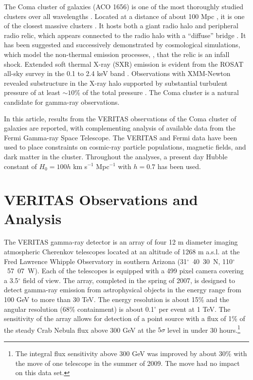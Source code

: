 \documentclass[12pt,manuscript]{aastex}
\begin{document}
The Coma cluster of galaxies (ACO 1656) is one of the most thoroughly studied clusters over all
wavelengths \citep{article:Voges_etal:1999}. Located at a distance of about 100 Mpc
\citep[$z=0.023$;][]{article:StrubleRood:1999}, it is one of the closest massive clusters
\citep[$M \sim10^{15}M_{\odot}$;][]{article:Smith:1983, article:Kubo_etal:2008}. It hosts both a
giant radio halo \citep{article:Giovannini_etal:1993,article:Thierbach_etal:2003} and peripheral
radio relic, which appears connected to the radio halo with a ``diffuse'' bridge 
\citep[see discussion in][]{article:BrownRudnick:2010}. It has been suggested
\citep{article:Ensslin_etal:1998} and successively demonstrated by cosmological simulations, which
model the non-thermal emission processes, \citep{article:PfrommerEnsslinSpringel:2008,
article:Pfrommer:2008, article:Battaglia_etal:2009, article:Skillman_etal:2011}, that the relic is
an infall shock. Extended soft thermal X-ray (SXR) emission is evident from the ROSAT all-sky
survey in the 0.1 to 2.4 keV band \citep{article:BrielHenryBohringer:1992}. Observations with
XMM-Newton \citep{article:Briel_etal:2001} revealed substructure in the X-ray halo supported by
substantial turbulent pressure of at least $\sim 10 \%$ of the total pressure
\citep{article:Schuecker_etal:2004}. The Coma cluster is a natural candidate for gamma-ray
observations.

In this article, results from the VERITAS observations of the Coma cluster of galaxies are
reported, with complementing analysis of available data from the Fermi Gamma-ray Space Telescope.
The VERITAS and Fermi data have been used to place constraints on cosmic-ray particle populations,
magnetic fields, and dark matter in the cluster. Throughout the analyses, a present day Hubble
constant of $H_{0} = 100h$ km s$^{-1}$ Mpc$^{-1}$ with $h=0.7$ has been used.

%
%

\section{VERITAS Observations and Analysis}
The VERITAS gamma-ray detector \citep{article:Weekes_etal:2002} is an array of four 12 m diameter
imaging atmospheric Cherenkov telescopes \citep[IACTs;][]{article:Holder_etal:2006} located at an
altitude of 1268 m a.s.l. at the Fred Lawrence Whipple Observatory in southern Arizona
(31$^{\circ}$~40\arcmin~30\arcsec~N, 110$^{\circ}$~57\arcmin~07\arcsec~W). Each of the telescopes
is equipped with a 499 pixel camera covering a 3.5$^{\circ}$ field of view. The array, completed in
the spring of 2007, is designed to detect gamma-ray emission from astrophysical objects in the
energy range from 100 GeV to more than 30 TeV. The energy resolution is about 15\% and the angular
resolution (68\% containment) is about 0.1$^{\circ}$ per event at 1 TeV. The sensitivity of the
array allows for detection of a point source with a flux of 1\% of the steady Crab Nebula flux
above 300 GeV at the $5\sigma$ level in under 30 hours.\footnote{The integral flux sensitivity
above 300 GeV was improved by about 30\% with the move of one telescope in the summer of 2009. The
move had no impact on this data set.}
\end{document}

